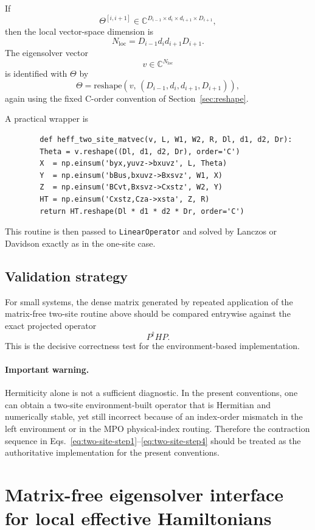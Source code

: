 \documentclass[aps,prb,onecolumn,nofootinbib]{revtex4-2}
\begin{document}
	If
	\[
	\Theta^{[i,i+1]} \in
	\mathbb{C}^{D_{i-1}\times d_i \times d_{i+1}\times D_{i+1}},
	\]
	then the local vector-space dimension is
	\[
	N_{\mathrm{loc}} = D_{i-1} d_i d_{i+1} D_{i+1}.
	\]
	The eigensolver vector
	\[
	v \in \mathbb{C}^{N_{\mathrm{loc}}}
	\]
	is identified with $\Theta$ by
	\[
	\Theta = \mathrm{reshape}(v,\,(D_{i-1},d_i,d_{i+1},D_{i+1})),
	\]
	again using the fixed C-order convention of Section~\ref{sec:reshape}.
	
	A practical wrapper is
	\begin{verbatim}
		def heff_two_site_matvec(v, L, W1, W2, R, Dl, d1, d2, Dr):
		Theta = v.reshape((Dl, d1, d2, Dr), order='C')
		X  = np.einsum('byx,yuvz->bxuvz', L, Theta)
		Y  = np.einsum('bBus,bxuvz->Bxsvz', W1, X)
		Z  = np.einsum('BCvt,Bxsvz->Cxstz', W2, Y)
		HT = np.einsum('Cxstz,Cza->xsta', Z, R)
		return HT.reshape(Dl * d1 * d2 * Dr, order='C')
	\end{verbatim}
	
	This routine is then passed to \texttt{LinearOperator} and solved by Lanczos or Davidson
	exactly as in the one-site case.
	
	\subsection{Validation strategy}
	
	For small systems, the dense matrix generated by repeated application of the matrix-free
	two-site routine above should be compared entrywise against the exact projected operator
	\[
	P^\dagger H P.
	\]
	This is the decisive correctness test for the environment-based implementation.
	
	\paragraph{Important warning.}
	Hermiticity alone is not a sufficient diagnostic. In the present conventions, one can
	obtain a two-site environment-built operator that is Hermitian and numerically stable,
	yet still incorrect because of an index-order mismatch in the left environment or in the
	MPO physical-index routing. Therefore the contraction sequence in
	Eqs.~\eqref{eq:two-site-step1}--\eqref{eq:two-site-step4} should be treated as the
	authoritative implementation for the present conventions.
	
	\section{Matrix-free eigensolver interface for local effective Hamiltonians}
	\label{sec:matfree}
	
\end{document}
